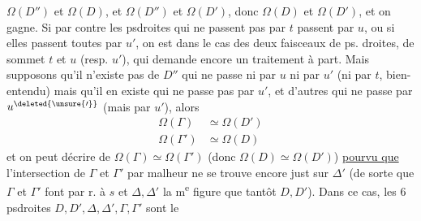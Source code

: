  $\Omega(D'')$  et $\Omega(D)$, et $\Omega(D'')$ et $\Omega(D')$, donc
$\Omega(D)$ et $\Omega(D')$, et on gagne. Si par contre
 les psdroites qui ne passent pas par $t$ passent
par $u$, ou si elles passent toutes par $u'$, on est
dans le cas des deux faisceaux de ps. droites,
de sommet $t$ et $u$ (resp. $u'$), qui demande
encore un traitement à part. Mais supposons
qu'il n'existe pas de $D''$ qui ne passe ni par
$u$ ni par $u'$ (ni par $t$, bien-entendu) mais
qu'il en existe  qui ne passe pas par $u'$,  et d'autres qui ne passe par $u^{\deleted{\unsure{\prime}}}$ (mais par $u'$), alors
\[
\begin{aligned}
\Omega(\Gamma)&\simeq\Omega(D')\\
\Omega(\Gamma')&\simeq\Omega(D)
\end{aligned}
\]
et on peut décrire de  $\Omega(\Gamma)\simeq\Omega(\Gamma')$
(donc $\Omega(D)\simeq\Omega(D')$) \uline{pourvu que} l'intersection  de $\Gamma$ et $\Gamma'$
par malheur ne se trouve encore just
sur $\Delta'$ (de sorte que $\Gamma$ et $\Gamma'$ font par r. à $s$
et $\Delta,\Delta'$ la m\textsuperscript{e} figure que tantôt $D,D'$).
Dans ce cas, les 6 psdroites $D,D',\Delta,\Delta',\Gamma,\Gamma'$ sont le
